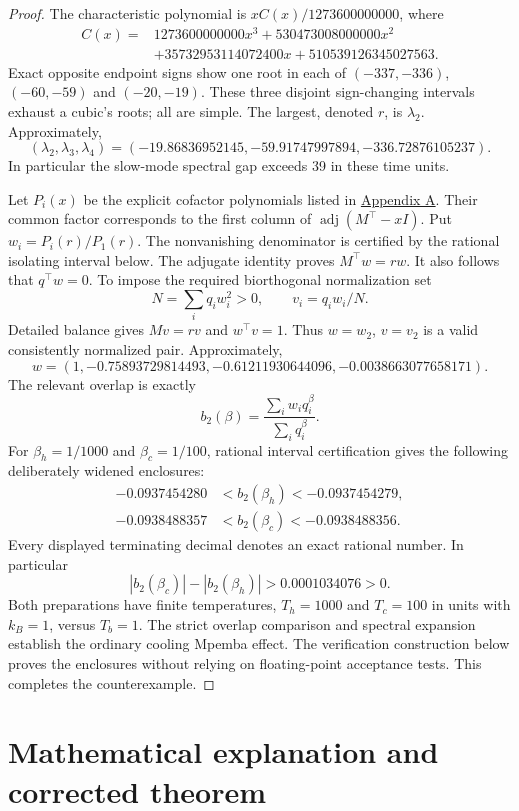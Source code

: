 \documentclass[11pt]{article}
\begin{document}
\begin{proof}
The characteristic polynomial is $xC(x)/1273600000000$, where
\begin{align*}
C(x)={}&1273600000000x^3+530473008000000x^2\\
&+35732953114072400x+510539126345027563.
\end{align*}
Exact opposite endpoint signs show one root in each of $(-337,-336)$, $(-60,-59)$ and $(-20,-19)$. These three disjoint sign-changing intervals exhaust a cubic's roots; all are simple. The largest, denoted $r$, is $\lambda_2$. Approximately,
\[
(\lambda_2,\lambda_3,\lambda_4)=(-19.86836952145,-59.91747997894,-336.72876105237).
\]
In particular the slow-mode spectral gap exceeds 39 in these time units.

Let $P_i(x)$ be the explicit cofactor polynomials listed in \hyperref[app:cofactors]{Appendix A}. Their common factor corresponds to the first column of $\operatorname{adj}(M^\top-xI)$. Put $w_i=P_i(r)/P_1(r)$. The nonvanishing denominator is certified by the rational isolating interval below. The adjugate identity proves $M^\top w=rw$. It also follows that $q^\top w=0$. To impose the required biorthogonal normalization set
\[
N=\sum_iq_iw_i^2>0,\qquad v_i=q_iw_i/N.
\]
Detailed balance gives $Mv=rv$ and $w^\top v=1$. Thus $w=w_2$, $v=v_2$ is a valid consistently normalized pair. Approximately,
\[
w=(1,-0.75893729814493,-0.61211930644096,-0.0038663077658171).
\]
The relevant overlap is exactly
\[
b_2(\beta)=\frac{\sum_iw_iq_i^\beta}{\sum_iq_i^\beta}.
\]
For $\beta_h=1/1000$ and $\beta_c=1/100$, rational interval certification gives the following deliberately widened enclosures:
\begin{align*}
-0.0937454280&<b_2(\beta_h)<-0.0937454279,\\
-0.0938488357&<b_2(\beta_c)<-0.0938488356.
\end{align*}
Every displayed terminating decimal denotes an exact rational number. In particular
\[
|b_2(\beta_c)|-|b_2(\beta_h)|>0.0001034076>0.
\]
Both preparations have finite temperatures, $T_h=1000$ and $T_c=100$ in units with $k_B=1$, versus $T_b=1$. The strict overlap comparison and spectral expansion establish the ordinary cooling Mpemba effect. The verification construction below proves the enclosures without relying on floating-point acceptance tests. This completes the counterexample.
\end{proof}

\section{Mathematical explanation and corrected theorem}
\end{document}
